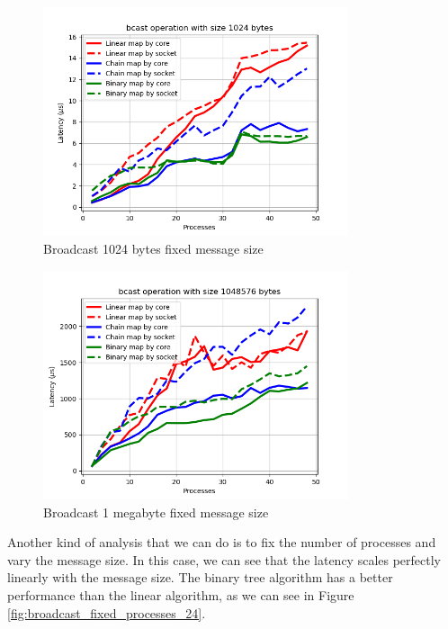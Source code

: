\begin{figure}[h!]
    \centering
    \includegraphics[width=0.8\textwidth]{../plots/bcast_fixedSize1024.png}
    \caption{Broadcast 1024 bytes fixed message size}
    \label{fig:broadcast_fixed_message_size_1024}
\end{figure}

\begin{figure}[h!]
    \centering
    \includegraphics[width=0.8\textwidth]{../plots/bcast_fixedSize1048576.png}
    \caption{Broadcast 1 megabyte fixed message size}
    \label{fig:broadcast_fixed_message_size_1048576}
\end{figure}

Another kind of analysis that we can do is to fix the number of processes and vary the message size. In this case, we can see that the latency scales perfectly linearly with the message size. The binary tree algorithm has a better performance than the linear algorithm, as we can see in Figure \ref{fig:broadcast_fixed_processes_24}.

